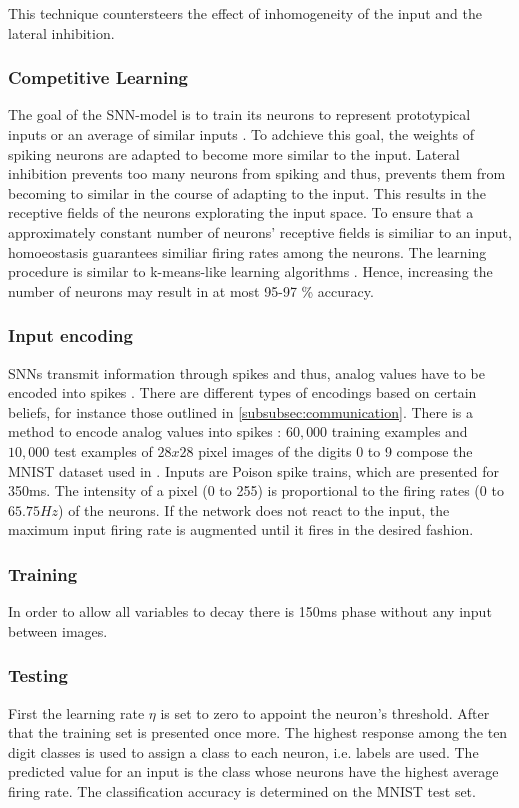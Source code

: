 This technique countersteers the effect of inhomogeneity of the input and the lateral inhibition.


\subsubsection{Competitive Learning}
The goal of the \ac{SNN}-model is to train its neurons to represent prototypical inputs or an average of similar inputs \cite{SNN}.
To adchieve this goal, the weights of spiking neurons are adapted to become more similar to the input.
Lateral inhibition prevents too many neurons from spiking and thus, prevents them from becoming to similar in the course of adapting to the input.
This results in the receptive fields of the neurons explorating the input space.
To ensure that a approximately constant number of neurons' receptive fields is similiar to an input, 
homoeostasis guarantees similiar firing rates among the neurons.
The learning procedure is similar to k-means-like learning algorithms \cite{SNN}.
Hence, increasing the number of neurons may result in at most 95-97 \% accuracy.


\subsubsection{Input encoding}
\acp{SNN} transmit information through spikes and thus, analog values have to be encoded into spikes \cite{DIET_SNN}.
There are different types of encodings based on certain beliefs, 
for instance those outlined in \autoref{subsubsec:communication}.
There is a method to encode analog values into spikes \cite{SNN}:
$60,000$ training examples and $10,000$ test examples of $28x28$ pixel images of the digits 0 to 9 compose the MNIST dataset used in \cite{SNN}.
Inputs are Poison spike trains, which are presented for 350ms.
The intensity of a pixel (0 to 255) is proportional to the firing rates (0 to $65.75 Hz$) of the neurons.
If the network does not react to the input, the maximum input firing rate is augmented until it fires in the desired fashion. 


\subsubsection{Training}
In order to allow all variables to decay there is 150ms phase without any input between images.

\subsubsection{Testing}
First the learning rate $\eta$ is set to zero to appoint the neuron's threshold.
After that the training set is presented once more.
The highest response among the ten digit classes is used to assign a class to each neuron, i.e. labels are used.
The predicted value for an input is the class whose neurons have the highest average firing rate.
The classification accuracy is determined on the MNIST test set.